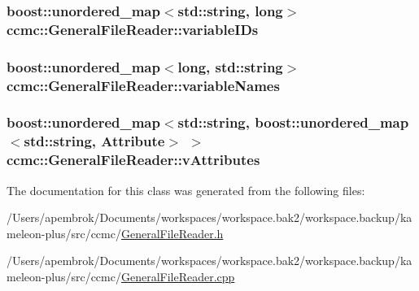 \hypertarget{classccmc_1_1_general_file_reader_a70d799a29940fa982885ce8c0963942d}{
\subsubsection[{variable\-I\-Ds}]{\setlength{\rightskip}{0pt plus 5cm}boost\-::unordered\-\_\-map$<$std\-::string, long$>$ ccmc\-::\-General\-File\-Reader\-::variable\-I\-Ds\hspace{0.3cm}{\ttfamily [protected]}}}\label{classccmc_1_1_general_file_reader_a70d799a29940fa982885ce8c0963942d}
\hypertarget{classccmc_1_1_general_file_reader_aa3a4c9091feaec12035bcc981299de47}{
\subsubsection[{variable\-Names}]{\setlength{\rightskip}{0pt plus 5cm}boost\-::unordered\-\_\-map$<$long, std\-::string$>$ ccmc\-::\-General\-File\-Reader\-::variable\-Names\hspace{0.3cm}{\ttfamily [protected]}}}\label{classccmc_1_1_general_file_reader_aa3a4c9091feaec12035bcc981299de47}
\hypertarget{classccmc_1_1_general_file_reader_a806b25ba22db767f9f61ae578634ef08}{
\subsubsection[{v\-Attributes}]{\setlength{\rightskip}{0pt plus 5cm}boost\-::unordered\-\_\-map$<$std\-::string, boost\-::unordered\-\_\-map$<$std\-::string, {\bf Attribute}$>$ $>$ ccmc\-::\-General\-File\-Reader\-::v\-Attributes\hspace{0.3cm}{\ttfamily [protected]}}}\label{classccmc_1_1_general_file_reader_a806b25ba22db767f9f61ae578634ef08}


The documentation for this class was generated from the following files\-:\begin{DoxyCompactItemize}
\item 
/\-Users/apembrok/\-Documents/workspaces/workspace.\-bak2/workspace.\-backup/kameleon-\/plus/src/ccmc/\hyperlink{_general_file_reader_8h}{General\-File\-Reader.\-h}\item 
/\-Users/apembrok/\-Documents/workspaces/workspace.\-bak2/workspace.\-backup/kameleon-\/plus/src/ccmc/\hyperlink{_general_file_reader_8cpp}{General\-File\-Reader.\-cpp}\end{DoxyCompactItemize}
